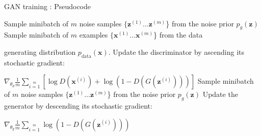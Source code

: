\begin{frame} {GAN training : Pseudocode}
  \begin{algorithm}[H]
  \footnotesize
    \caption{Minibatch stochastic gradient descent training of GANs. The number of steps ,$k$ to apply to the discriminatoris a hyperparameter}
    \begin{algorithmic}[1]
          \State Sample minibatch of $m$ noise samples $\{\mathbf{z}^{(1)} \ldots \mathbf{z}^{(m)}$\} from the noise prior $p_g(\mathbf{z})$
          \State Sample minibatch of $m$ examples $\{\mathbf{x}^{(1)} \ldots \mathbf{x}^{(m)}$\} from the data \item[]
 generating distribution $p_{\text{data}}(\mathbf{x})$.
          \State Update the discriminator by ascending its stochastic gradient: \item[]
  \hspace{2.5 cm}          $\nabla_{{\theta}_d} \frac {1}{m} \sum \limits_{i=1} \limits^{m} \left [ \log D(\mathbf{x}^{(i)}) + \log (1 - D(G(\mathbf{z}^{(i)}))) \right]$
        \EndFor
        \State Sample minibatch of $m$ noise samples $\{\mathbf{z}^{(1)} \ldots \mathbf{z}^{(m)}$\} from the noise prior $p_g(\mathbf{z})$
        \State Update the generator by descending its stochastic gradient: \item[]
   \hspace{2.5 cm}       $\nabla_{{\theta}_g} \frac {1}{m} \sum \limits_{i=1} \limits^{m} \log (1 - D(G(\mathbf{z}^{(i)})))$
      \EndFor
    \end{algorithmic}
  \end{algorithm}
\end{frame}


